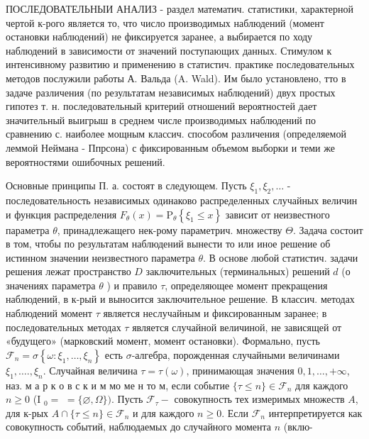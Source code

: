 \documentclass[10pt]{article}
\begin{document}
ПОСЛЕДОВАТЕЛЬНЫИ АНАЛИЗ - раздел математич. статистики, характерной чертой к-рого является то, что число производимых наблюдений (момент остановки наблюдений) не фиксируется заранее, а выбирается по ходу наблюдений в зависимости от значений поступающих данных. Стимулом к интенсивному развитию и применению в статистич. практике последовательных методов послужили работы А. Вальда (A. Wald). Им было установлено, тто в задаче различения (по результатам независимых наблюдений) двух простых гипотез т. н. последовательный критерий отношений вероятностей дает значительный выигрыш в среднем числе производимых наблюдений по сравнению с. наиболее мощным классич. способом различения (определяемой леммой Неймана - Ппрсона) с фиксированным объемом выборки и теми же вероятностями ошибочных решений.



Основные принципы П. а. состоят в следующем. Пусть $\xi_{1}, \xi_{2}, \ldots$ - последовательность независимых одинаково распределенных случайных величин и функция распределения $F_{\theta}(x)=\mathrm{P}_{\theta}\left\{\xi_{1} \leqslant x\right\}$ зависит от неизвестного параметра $\theta$, принадлежащего нек-рому параметрич. множеству $\Theta$. Задача состоит в том, чтобы по результатам наблюдений вынести то или иное решение об истинном значении неизвестного параметра $\theta$. В основе любой статистич. задачи решения лежат пространство $D$ заключительных (терминальных) решений $d$ (о значениях параметра $\theta$ ) и правило $\tau$, определяющее момент прекращения наблюдений, в к-рый и выносится заключительное решение. В классич. методах наблюдений момент $\tau$ является неслучайным и фиксированным заранее; в последовательных методах $\tau$ является случайной величиной, не зависящей от «будущего» (марковский момент, момент остановки). Формально, пусть $\mathscr{F}_{n}=\sigma\left\{\omega: \xi_{1}, \ldots, \xi_{n}\right\}$ есть $\sigma$-алгебра, порожденная случайными величинами $\xi_{1}, \ldots ., \xi_{n}$. Случайная величина $\tau=\tau(\omega)$, принимающая значения $0,1, \ldots,+\infty$, наз. м а р к о в с к и м мо ме н то м, если событие $\{\tau \leqslant n\} \in \mathscr{F}_{n}$ для каждого $n \geqslant 0$ (I $_{0}=$ $=\{\varnothing, \Omega\})$. Пусть $\mathscr{F}_{\tau}-$ совокупность тех измеримых множеств $A$, для к-рых $A \cap\{\tau \leqslant n\} \in \mathscr{F}_{n}$ и для каждого $n \geqslant 0$. Если $\mathscr{F}_{n}$ интерпретируется как совокупность событий, наблюдаемых до случайного момента $n$ (вклю-
\end{document}
